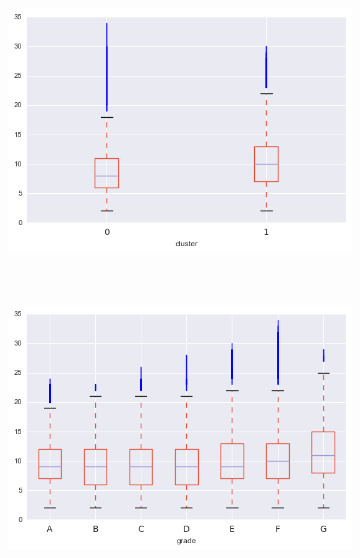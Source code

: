 \begin{anexosenv}
\begin{figure}[t!]
\begin{subfigure}[t]{0.5\textwidth}
            \centerline{\includegraphics[width=1\textwidth]{img/open_acc_by_cluster}}
        \end{subfigure}%
        ~ 
        \begin{subfigure}[t]{0.5\textwidth}
            \centering
   
            \centerline{\includegraphics[width=1\textwidth]{img/open_acc_by_grade}}

        \end{subfigure}
        \\
                \caption{pub\textunderscore rec}
        \begin{subfigure}[t]{0.5\textwidth}
            \centering


\end{subfigure}
\end{figure}
\end{anexosenv}
